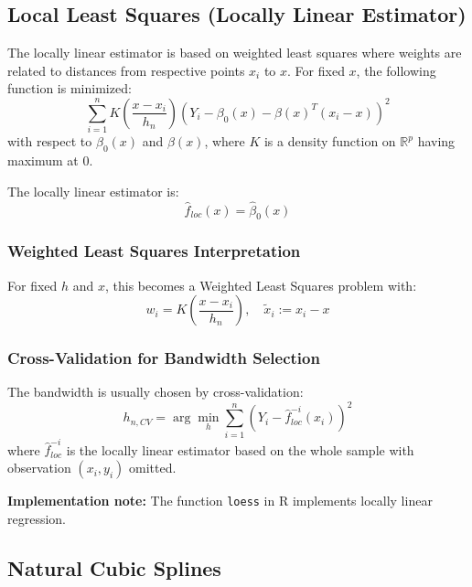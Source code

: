 \documentclass[12pt,a4paper]{article}
\begin{document}
\subsection{Local Least Squares (Locally Linear Estimator)}

The locally linear estimator is based on weighted least squares where weights are related to distances from respective points $x_i$ to $x$. For fixed $x$, the following function is minimized:
\begin{equation}
\sum_{i=1}^n K\left(\frac{x - x_i}{h_n}\right)(Y_i - \beta_0(x) - \beta(x)^T(x_i - x))^2
\end{equation}
with respect to $\beta_0(x)$ and $\beta(x)$, where $K$ is a density function on $\mathbb{R}^p$ having maximum at 0.

The locally linear estimator is:
\begin{equation}
\hat{f}_{loc}(x) = \hat{\beta}_0(x)
\end{equation}

\subsubsection{Weighted Least Squares Interpretation}

For fixed $h$ and $x$, this becomes a Weighted Least Squares problem with:
\begin{equation}
w_i = K\left(\frac{x - x_i}{h_n}\right), \quad \tilde{x}_i := x_i - x
\end{equation}

\subsubsection{Cross-Validation for Bandwidth Selection}

The bandwidth is usually chosen by cross-validation:
\begin{equation}
h_{n,CV} = \arg\min_h \sum_{i=1}^n (Y_i - \hat{f}_{loc}^{-i}(x_i))^2
\end{equation}
where $\hat{f}_{loc}^{-i}$ is the locally linear estimator based on the whole sample with observation $(x_i, y_i)$ omitted.

\textbf{Implementation note:} The function \texttt{loess} in R implements locally linear regression.

\subsection{Natural Cubic Splines}
\end{document}
